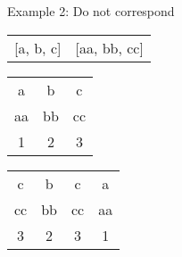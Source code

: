 \documentclass{beamer}
\begin{document}
\begin{frame}{Example 2: Do not correspond}
  \begin{table}
    \begin{tabular}{cc}
      [a, b, c] & [aa, bb, cc] \\
    \end{tabular}
  \end{table}
  \vspace{3mm}
  \begin{table}
    \begin{tabular}{ccc}
      \toprule
      a  & b  & c \\
      aa & bb & cc \\
      {\scriptsize \color{gmitblue} 1} & {\scriptsize \color{gmitblue} 2} & {\scriptsize \color{gmitblue} 3}\\
      \bottomrule
    \end{tabular}
  \end{table}
  \vspace{4mm}
  \begin{table}
    \begin{tabular}{cccc}
      \toprule
      c  & b  & c  & a  \\
      cc & bb & cc & aa \\
      {\scriptsize \color{gmitblue} 3} & {\scriptsize \color{gmitblue} 2} & {\scriptsize \color{gmitblue} 3} & {\scriptsize \color{gmitblue} 1}\\
      \bottomrule
    \end{tabular}
  \end{table}
\end{frame}
\end{document}
